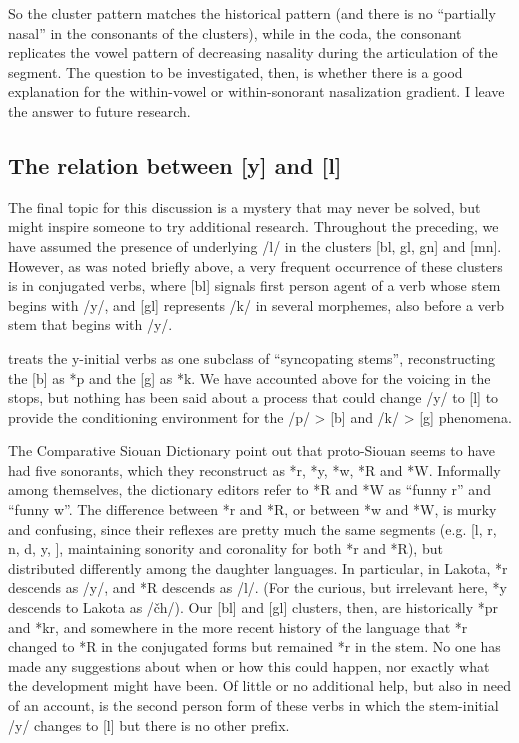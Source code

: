 \documentclass[output=paper]{LSP/langsci}
\begin{document}
So the cluster pattern matches the historical pattern (and there is no ``partially nasal'' in the consonants of the clusters), while in the coda, the consonant replicates the vowel pattern of decreasing nasality during the articulation of the segment. The question to be investigated, then, is whether there is a good explanation for the within-vowel or within-sonorant nasalization gradient. I leave the answer to future research.

\subsection{The relation between [y] and [l]}

The final topic for this discussion is a mystery that may never be solved, but might inspire someone to try additional research. Throughout the preceding, we have assumed the presence of underlying /l/ in the clusters [bl, gl, gn] and [mn]. However, as was noted briefly above, a very frequent occurrence of these clusters is in conjugated verbs, where [bl] signals first person agent of a verb whose stem begins with /y/, and [gl] represents /k/ in several morphemes, also before a verb stem that begins with /y/.

\citet{Koontz1991} treats the y-initial verbs as one subclass of ``syncopating stems'', reconstructing the [b] as *p and the [g] as *k. We have accounted above for the voicing in the stops, but nothing has been said about a process that could change /y/ to [l] to provide the conditioning environment for the /p/ > [b] and /k/ > [g] phenomena.

The Comparative Siouan Dictionary \citep{RankinEtAl1998,RankinEtAl2015} point out that proto-Siouan seems to have had five sonorants, which they reconstruct as *r, *y, *w, *R and *W. Informally among themselves, the dictionary editors refer to *R and *W as ``funny r'' and ``funny w''. The difference between *r and *R, or between *w and *W, is murky and confusing, since their reflexes are pretty much the same segments (e.g. [l, r, n, d, y, ], maintaining sonority and coronality for both *r and *R), but distributed differently among the daughter languages. In particular, in Lakota, *r descends as /y/, and *R descends as /l/. (For the curious, but irrelevant here, *y descends to Lakota as /\v{c}h/). Our [bl] and [gl] clusters, then, are historically *pr and *kr, and somewhere in the more recent history of the language that *r changed to *R in the conjugated forms but remained *r in the stem. No one has made any suggestions about when or how this could happen, nor exactly what the development might have been. Of little or no additional help, but also in need of an account, is the second person form of these verbs in which the stem-initial /y/ changes to [l] but there is no other prefix.
\end{document}

